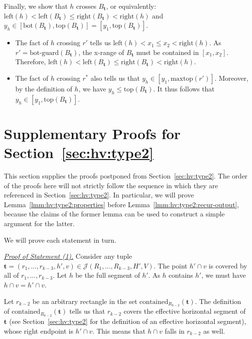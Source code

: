 \documentclass[acmsmall,review,anonymous]{acmart}
\def\vgap{\vspace{1mm}}
\def\extraspacing{\vspace{2mm} \noindent}
\def\J{\mathcal{J}}
\def\xleft{\mathrm{left}}
\def\xright{\mathrm{right}}
\def\ybot{\mathrm{bot}}
\def\ytop{\mathrm{top}}
\def\maxtop{\mathrm{maxtop}}
\def\gbot{\mathrm{bot\text{-}guard}}
\def\contained{\mathrm{contained}}
\begin{document}
{{{\vgap

Finally, we show that $h$ crosses $B_{\bm{t}}$, or equivalently: $\xleft(h) < \xleft(B_{\bm{t}}) \le \xright(B_{\bm{t}}) < \xright(h)$ and $y_h \in [\ybot(B_\bm{t}), \ytop(B_{\bm{t}})] = [y_1, \ytop(B_{\bm{t}})]$.
\begin{itemize}
    \item The fact of $h$ crossing $r'$ tells us $\xleft(h) < x_1 \leq x_2 < \xright(h)$. As $r' = \gbot(B_{\bm{t}})$, the x-range of $B_{\bm{t}}$ must be contained in $[x_1,x_2]$. Therefore, $\xleft(h) < \xleft(B_{\bm{t}}) \le \xright(B_{\bm{t}}) < \xright(h)$.

    \vgap

    \item The fact of $h$ crossing $r^*$ also tells us that $y_h \in [y_1, \maxtop(r')]$. Moreover, by the definition of $h$, we have $y_h \leq \ytop(B_{\bm{t}})$. It thus follows that $y_h \in [y_1, \ytop(B_{\bm{t}})]$.
\end{itemize}

\section{Supplementary Proofs for Section~\ref{sec:hv:type2}} \label{app:hv:type2}

This section supplies the proofs postponed from Section~\ref{sec:hv:type2}. The order of the proofs here will not strictly follow the sequence in which they are referenced in Section~\ref{sec:hv:type2}. In particular, we will prove Lemma~\ref{lmm:hv:type2:properties} before Lemma~\ref{lmm:hv:type2:recur-output}, because the claims of the former lemma can be used to construct a simple argument for the latter.

\extraspacing {\bf Proof of Lemma~\ref{lmm:hv:type2:properties}.} We will prove each statement in turn.

\extraspacing \underline{\em Proof of Statement (1).} Consider any tuple $\bm{t} = (r_1,...,r_{k-3}, h', v) \in \J(R_1,...,R_{k-3},H',V)$. The point $h' \cap v$ is covered by all of $r_1,...,r_{k-3}$. Let $h$ be the full segment of $h'$. As $h$ contains $h'$, we must have $h \cap v = h' \cap v$.

\vgap

Let $r_{k-2}$ be an arbitrary rectangle in the set $\contained_{R_{k-2}}(\bm{t})$. The definition of $\contained_{R_{k-2}}(\bm{t})$ tells us that $r_{k-2}$ covers the effective horizontal segment of $\bm{t}$ (see Section~\ref{sec:hv:type2} for the definition of an effective horizontal segment), whose right endpoint is $h' \cap v$. This means that $h \cap v$ falls in $r_{k-2}$ as well.

}}}
\end{document}

